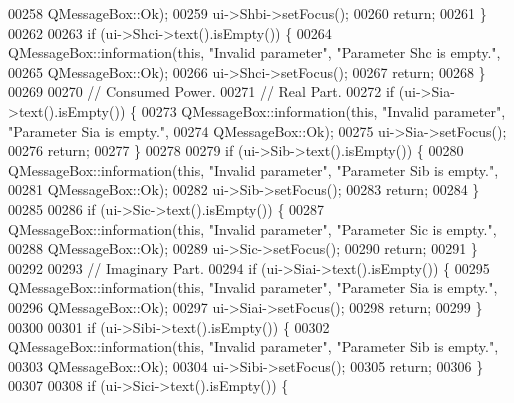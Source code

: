 \begin{DoxyCode}
00258                              QMessageBox::Ok);
00259     ui->Shbi->setFocus();
00260     \textcolor{keywordflow}{return};
00261   \}
00262 
00263   \textcolor{keywordflow}{if} (ui->Shci->text().isEmpty()) \{
00264     QMessageBox::information(\textcolor{keyword}{this}, \textcolor{stringliteral}{"Invalid parameter"}, \textcolor{stringliteral}{"Parameter Shc is empty."},
00265                              QMessageBox::Ok);
00266     ui->Shci->setFocus();
00267     \textcolor{keywordflow}{return};
00268   \}
00269 
00270   \textcolor{comment}{// Consumed Power.}
00271   \textcolor{comment}{// Real Part.}
00272   \textcolor{keywordflow}{if} (ui->Sia->text().isEmpty()) \{
00273     QMessageBox::information(\textcolor{keyword}{this}, \textcolor{stringliteral}{"Invalid parameter"}, \textcolor{stringliteral}{"Parameter Sia is empty."},
00274                              QMessageBox::Ok);
00275     ui->Sia->setFocus();
00276     \textcolor{keywordflow}{return};
00277   \}
00278 
00279   \textcolor{keywordflow}{if} (ui->Sib->text().isEmpty()) \{
00280     QMessageBox::information(\textcolor{keyword}{this}, \textcolor{stringliteral}{"Invalid parameter"}, \textcolor{stringliteral}{"Parameter Sib is empty."},
00281                              QMessageBox::Ok);
00282     ui->Sib->setFocus();
00283     \textcolor{keywordflow}{return};
00284   \}
00285 
00286   \textcolor{keywordflow}{if} (ui->Sic->text().isEmpty()) \{
00287     QMessageBox::information(\textcolor{keyword}{this}, \textcolor{stringliteral}{"Invalid parameter"}, \textcolor{stringliteral}{"Parameter Sic is empty."},
00288                              QMessageBox::Ok);
00289     ui->Sic->setFocus();
00290     \textcolor{keywordflow}{return};
00291   \}
00292 
00293   \textcolor{comment}{// Imaginary Part.}
00294   \textcolor{keywordflow}{if} (ui->Siai->text().isEmpty()) \{
00295     QMessageBox::information(\textcolor{keyword}{this}, \textcolor{stringliteral}{"Invalid parameter"}, \textcolor{stringliteral}{"Parameter Sia is empty."},
00296                              QMessageBox::Ok);
00297     ui->Siai->setFocus();
00298     \textcolor{keywordflow}{return};
00299   \}
00300 
00301   \textcolor{keywordflow}{if} (ui->Sibi->text().isEmpty()) \{
00302     QMessageBox::information(\textcolor{keyword}{this}, \textcolor{stringliteral}{"Invalid parameter"}, \textcolor{stringliteral}{"Parameter Sib is empty."},
00303                              QMessageBox::Ok);
00304     ui->Sibi->setFocus();
00305     \textcolor{keywordflow}{return};
00306   \}
00307 
00308   \textcolor{keywordflow}{if} (ui->Sici->text().isEmpty()) \{

\end{DoxyCode}

